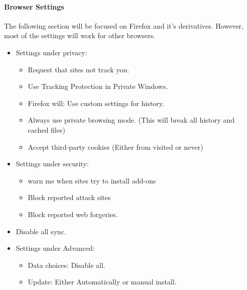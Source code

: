 \documentclass[a4paper,11pt]{article}
\begin{document}
		\paragraph{Browser Settings}
			The following section will be focused on Firefox and it's derivatives. 
			However, most of the settings will work for other browsers. 
			\begin{itemize}
				\item Settings under privacy:
					\begin{itemize}
						\item Request that sites not track you. 
						\item Use Tracking Protection in Private Windows. 
						\item Firefox will: Use custom settings for history. 
						\item Always use private browsing mode. (This will break all history and cached files) 
						\item Accept third-party cookies (Either from visited or never)
					\end{itemize}
				\item Settings under security:
					\begin{itemize}
						\item warn me when sites try to install add-ons
						\item Block reported attack sites
						\item Block reported web forgeries. 
					\end{itemize}
				\item Disable all sync. 
				\item Settings under Advanced:
					\begin{itemize}
						\item Data choices: Disable all.
						\item Update: Either Automatically or manual install. 
					\end{itemize}
			\end{itemize}
\end{document}
